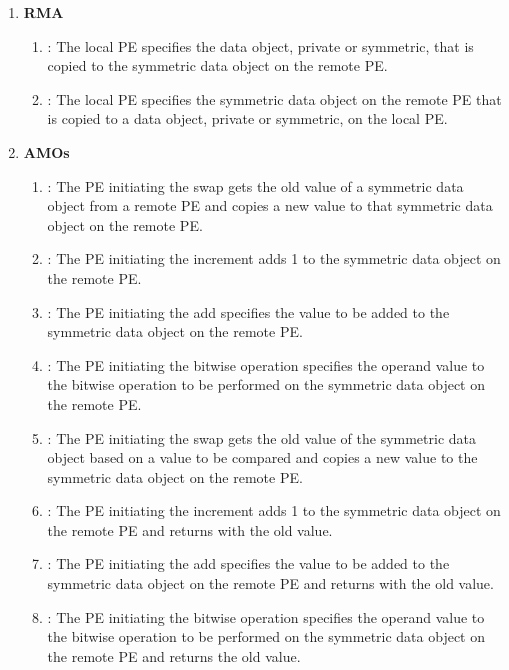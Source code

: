 \begin{enumerate}
\item \textbf{\acf{RMA}}
\begin{enumerate}
    \item \PUT: The local \ac{PE} specifies the \source{} data object, private
        or symmetric, that is copied to the symmetric data object on the remote
        \ac{PE}.
  \item \GET: The local \ac{PE} specifies the symmetric data object on the remote
      \ac{PE} that is copied to a data object, private or symmetric, on the local
      \ac{PE}.
\end{enumerate}

\item \textbf{\acfp{AMO}}
\begin{enumerate}
    \item {}: The \ac{PE} initiating the swap gets the old value of a
        symmetric data object from a remote \ac{PE} and copies a new value to
        that symmetric data object on the remote \ac{PE}.
  \item {}: The \ac{PE} initiating the increment adds 1 to the
      symmetric data object on the remote \ac{PE}.
  \item {}: The \ac{PE} initiating the add specifies the value to be added
      to the symmetric data object on the remote \ac{PE}.
  \item {}: The \ac{PE} initiating the bitwise
      operation specifies the operand value to the bitwise operation to be
      performed on the symmetric data object on the remote \ac{PE}.
  \item {}: The \ac{PE} initiating the swap gets the old value
      of the symmetric data object based on a value to be compared and copies a
      new value to the symmetric data object on the remote \ac{PE}.
  \item {}: The \ac{PE} initiating the increment adds 1 to
      the symmetric data object on the remote \ac{PE} and returns with the old
      value.
  \item {}: The \ac{PE} initiating the add specifies the value to
      be added to the symmetric data object on the remote \ac{PE} and returns with
      the old value.
  \item {}: The \ac{PE} initiating the bitwise
      operation specifies the operand value to the bitwise operation to be
      performed on the symmetric data object on the remote \ac{PE}
      and returns the old value.
\end{enumerate}


\end{enumerate}
